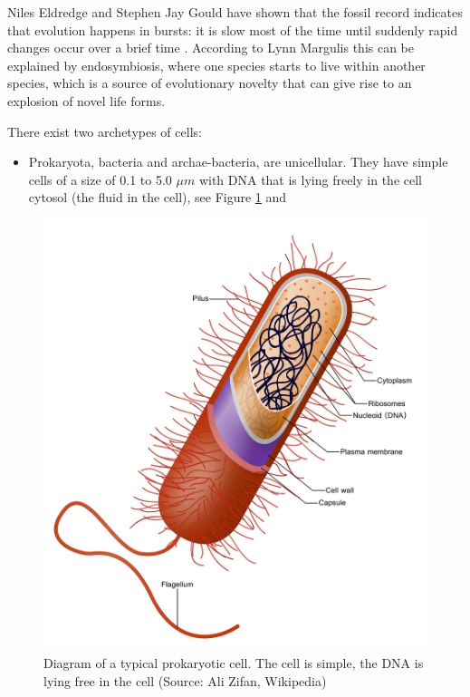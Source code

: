 \documentclass[
  11pt,
]{book}
\providecommand{\tightlist}{%
  \setlength{\itemsep}{0pt}\setlength{\parskip}{0pt}}
\begin{document}
Niles Eldredge and Stephen Jay Gould have shown that the fossil record indicates that evolution happens in bursts: it is slow most of the time until suddenly rapid changes occur over a brief time \citep{margulis1999}. According to Lynn Margulis this can be explained by endosymbiosis, where one species starts to live within another species, which is a source of evolutionary novelty that can give rise to an explosion of novel life forms.

There exist two archetypes of cells:

\begin{itemize}
\tightlist
\item
  Prokaryota, bacteria and archae-bacteria, are unicellular. They have simple cells of a size of 0.1 to 5.0 \(\mu m\) with DNA that is lying freely in the cell cytosol (the fluid in the cell), see Figure \ref{fig:prokaryotaCell} and
\end{itemize}

\begin{figure}

{\centering \includegraphics[width=0.5\linewidth]{./figs/prokaryoteCell} 

}

\caption{Diagram of a typical prokaryotic cell. The cell is simple, the DNA is lying free in the cell (Source: Ali Zifan, Wikipedia)}\label{fig:prokaryotaCell}
\end{figure}
\end{document}
